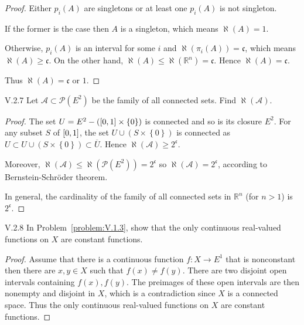 \begin{proof}
	Either \( p_{i}(A) \) are singletons or at least one \( p_{i}(A) \) is not singleton.

	If the former is the case then \( A \) is a singleton, which means \( \aleph(A) = 1 \).

	Otherwise, \( p_{i}(A) \) is an interval for some \(i\) and \( \aleph(\pi_{i}(A)) = \mathfrak{c} \), which means \( \aleph(A) \ge \mathfrak{c} \). On the other hand, \( \aleph(A) \le \aleph(\mathbb{R}^{n}) = \mathfrak{c} \). Hence \( \aleph(A) = \mathfrak{c} \).

	Thus \( \aleph(A) = \mathfrak{c} \) or \(1\).
\end{proof}

\begin{problem}{V.2.7}
Let \( \mathscr{A} \subset \mathscr{P}(E^{2}) \) be the family of all connected sets. Find \( \aleph(\mathscr{A}) \).
\end{problem}

\begin{proof}
	The set \( U = E^{2} - (\left\lbrack{0, 1}\right\rbrack \times \left\{0\right\}) \) is connected and so is its closure \( E^{2} \). For any subset \( S \) of \( \left\lbrack{0,1}\right\rbrack \), the set \( U \cup (S \times \left\{0\right\}) \) is connected as \( U \subset U \cup (S \times \left\{0\right\}) \subset \overline{U} \). Hence \( \aleph(\mathscr{A}) \ge 2^{\mathfrak{c}} \).

	Moreover, \( \aleph(\mathscr{A}) \le \aleph(\mathscr{P}(E^{2})) = 2^{\mathfrak{c}} \) so \( \aleph(\mathscr{A}) = 2^{\mathfrak{c}} \), according to Bernstein-Schr\"{o}der theorem.

	In general, the cardinality of the family of all connected sets in \( \mathbb{R}^{n} \) (for \(n > 1\)) is \( 2^{\mathfrak{c}} \).
\end{proof}

\begin{problem}{V.2.8}
In Problem~\ref{problem:V.1.3}, show that the only continuous real-valued functions on \(X\) are constant functions.
\end{problem}

\begin{proof}
	Assume that there is a continuous function \( f: X \to E^{1} \) that is nonconstant then there are \( x, y \in X \) such that \( f(x) \ne f(y) \). There are two disjoint open intervals containing \( f(x), f(y) \). The preimages of these open intervals are then nonempty and disjoint in \( X \), which is a contradiction since \( X \) is a connected space. Thus the only continuous real-valued functions on \(X\) are constant functions.
\end{proof}

